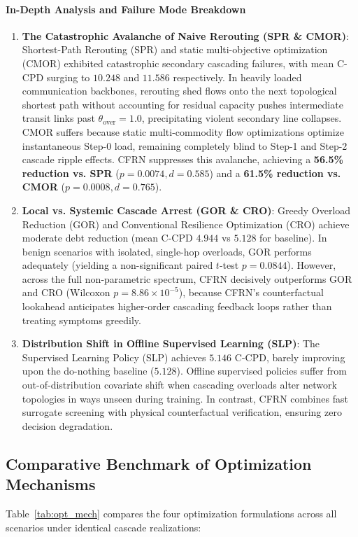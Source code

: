 \documentclass[pdflatex,sn-mathphys-num]{sn-jnl}
\theoremstyle{thmstyleone}
\theoremstyle{thmstyletwo}
\theoremstyle{thmstylethree}
\begin{document}
\paragraph{In-Depth Analysis and Failure Mode Breakdown}
\begin{enumerate}
    \item \textbf{The Catastrophic Avalanche of Naive Rerouting (SPR \& CMOR)}: Shortest-Path Rerouting (SPR) and static multi-objective optimization (CMOR) exhibited catastrophic secondary cascading failures, with mean C-CPD surging to $10.248$ and $11.586$ respectively. In heavily loaded communication backbones, rerouting shed flows onto the next topological shortest path without accounting for residual capacity pushes intermediate transit links past $\theta_{\mathrm{over}} = 1.0$, precipitating violent secondary line collapses. CMOR suffers because static multi-commodity flow optimizations optimize instantaneous Step-0 load, remaining completely blind to Step-1 and Step-2 cascade ripple effects. CFRN suppresses this avalanche, achieving a \textbf{56.5\% reduction vs. SPR} ($p = 0.0074, d = 0.585$) and a \textbf{61.5\% reduction vs. CMOR} ($p = 0.0008, d = 0.765$).
    \item \textbf{Local vs. Systemic Cascade Arrest (GOR \& CRO)}: Greedy Overload Reduction (GOR) and Conventional Resilience Optimization (CRO) achieve moderate debt reduction (mean C-CPD $4.944$ vs $5.128$ for baseline). In benign scenarios with isolated, single-hop overloads, GOR performs adequately (yielding a non-significant paired $t$-test $p = 0.0844$). However, across the full non-parametric spectrum, CFRN decisively outperforms GOR and CRO ($\text{Wilcoxon } p = 8.86 \times 10^{-5}$), because CFRN's counterfactual lookahead anticipates higher-order cascading feedback loops rather than treating symptoms greedily.
    \item \textbf{Distribution Shift in Offline Supervised Learning (SLP)}: The Supervised Learning Policy (SLP) achieves $5.146$ C-CPD, barely improving upon the do-nothing baseline ($5.128$). Offline supervised policies suffer from out-of-distribution covariate shift when cascading overloads alter network topologies in ways unseen during training. In contrast, CFRN combines fast surrogate screening with physical counterfactual verification, ensuring zero decision degradation.
\end{enumerate}

\subsection{Comparative Benchmark of Optimization Mechanisms}
Table~\ref{tab:opt_mech} compares the four optimization formulations across all scenarios under identical cascade realizations:
\end{document}
